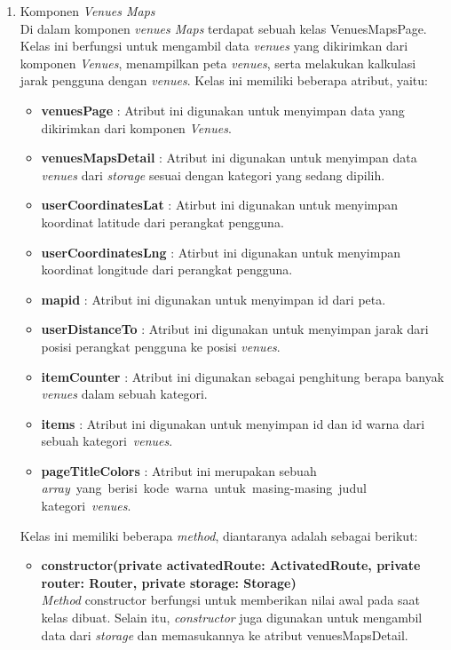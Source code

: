 \begin{enumerate}
			\item Komponen \textit{Venues Maps}\\ 
				Di dalam komponen \textit{venues Maps} terdapat sebuah kelas VenuesMapsPage. Kelas ini berfungsi untuk mengambil data \textit{venues} yang dikirimkan dari komponen \textit{Venues}, menampilkan peta \textit{venues}, serta melakukan kalkulasi jarak pengguna dengan \textit{venues}. Kelas ini memiliki beberapa atribut, yaitu:
				
				\begin{itemize}
					\item \textbf{venuesPage} : Atribut ini digunakan untuk menyimpan data yang dikirimkan dari komponen \textit{Venues}.
					\item \textbf{venuesMapsDetail} : Atribut ini digunakan untuk menyimpan data \textit{venues} dari \textit{storage} sesuai dengan kategori yang sedang dipilih.
					\item \textbf{userCoordinatesLat} : Atirbut ini digunakan untuk menyimpan koordinat latitude dari perangkat pengguna.
					\item \textbf{userCoordinatesLng} : Atirbut ini digunakan untuk menyimpan koordinat longitude dari perangkat pengguna.
					\item \textbf{mapid} : Atribut ini digunakan untuk menyimpan id dari peta.
					\item \textbf{userDistanceTo} : Atribut ini digunakan untuk menyimpan jarak dari posisi perangkat pengguna ke posisi \textit{venues}.
					\item \textbf{itemCounter} : Atribut ini digunakan sebagai penghitung berapa banyak \textit{venues} dalam sebuah kategori.
					\item \textbf{items} : Atribut ini digunakan untuk menyimpan id dan id warna dari sebuah kategori~\textit{venues}.
					\item \textbf{pageTitleColors} : Atribut ini merupakan sebuah \textit{array}~yang~berisi~kode~warna~untuk~masing-masing~judul kategori~\textit{venues}.
				\end{itemize} 
				Kelas ini memiliki beberapa \textit{method}, diantaranya adalah sebagai berikut:
				\begin{itemize}
					\item \textbf{constructor(private activatedRoute: ActivatedRoute, private router: Router, private storage: Storage)} \\
					\newpage
						\textit{Method} constructor berfungsi untuk memberikan nilai awal pada saat kelas dibuat. Selain itu, \textit{constructor} juga digunakan untuk mengambil data dari \textit{storage} dan memasukannya ke atribut venuesMapsDetail.\\

\end{itemize}
\end{enumerate}
